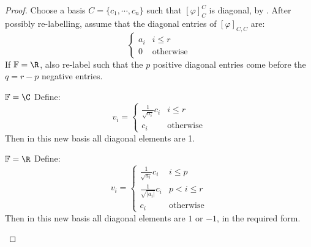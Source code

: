\documentclass[../Main.tex]{subfiles}
\begin{document}
\begin{proof}
    Choose a basis $C = \{c_1, \cdots, c_n\}$ such that $[\varphi]_C^C$ is diagonal, by . After possibly re-labelling, assume that the diagonal entries of $[\varphi]_{C, C}$ are:
    \begin{equation*}
        \begin{cases}
            a_i & i \leq r \\
            0 & \text{otherwise}
        \end{cases}
    \end{equation*}
    If $\F = \R$, also re-label such that the $p$ positive diagonal entries come before the $q = r - p$ negative entries.

    \begin{case}{$\F = \C$}
        Define:
        \begin{equation*}
            v_i =
            \begin{cases}
                \frac{1}{\sqrt{a_i}}c_i & i \leq r \\
                c_i & \text{otherwise}
            \end{cases}
        \end{equation*}
        Then in this new basis all diagonal elements are 1.
    \end{case}
    \begin{case}{$\F = \R$}
        Define:
        \begin{equation*}
            v_i =
            \begin{cases}
                \frac{1}{\sqrt{a_i}}c_i & i \leq p \\
                \frac{1}{\sqrt{|a_i|}}c_i & p < i \leq r \\
                c_i & \text{otherwise}
            \end{cases}
        \end{equation*}
        Then in this new basis all diagonal elements are $1$ or $-1$, in the required form.
    \end{case}
\end{proof}
\end{document}
